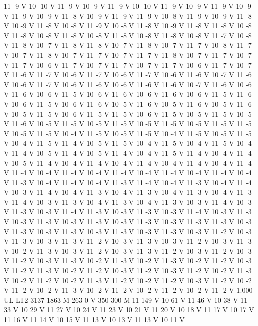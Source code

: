 {11 -9 V
10 -10 V
11 -9 V
10 -9 V
11 -9 V
10 -10 V
11 -9 V
10 -9 V
11 -9 V
10 -9 V
11 -9 V
10 -9 V
11 -8 V
10 -9 V
11 -9 V
11 -9 V
10 -8 V
11 -9 V
10 -9 V
11 -8 V
10 -9 V
11 -8 V
10 -8 V
11 -9 V
10 -8 V
11 -8 V
10 -9 V
11 -8 V
11 -8 V
10 -8 V
11 -8 V
10 -8 V
11 -8 V
10 -8 V
11 -8 V
10 -8 V
11 -8 V
10 -8 V
11 -7 V
10 -8 V
11 -8 V
10 -7 V
11 -8 V
11 -8 V
10 -7 V
11 -8 V
10 -7 V
11 -7 V
10 -8 V
11 -7 V
10 -7 V
11 -8 V
10 -7 V
11 -7 V
10 -7 V
11 -7 V
11 -8 V
10 -7 V
11 -7 V
10 -7 V
11 -7 V
10 -6 V
11 -7 V
10 -7 V
11 -7 V
10 -7 V
11 -7 V
10 -6 V
11 -7 V
10 -7 V
11 -6 V
11 -7 V
10 -6 V
11 -7 V
10 -6 V
11 -7 V
10 -6 V
11 -6 V
10 -7 V
11 -6 V
10 -6 V
11 -7 V
10 -6 V
11 -6 V
10 -6 V
11 -6 V
11 -6 V
10 -7 V
11 -6 V
10 -6 V
11 -6 V
10 -6 V
11 -5 V
10 -6 V
11 -6 V
10 -6 V
11 -6 V
10 -6 V
11 -5 V
11 -6 V
10 -6 V
11 -5 V
10 -6 V
11 -6 V
10 -5 V
11 -6 V
10 -5 V
11 -6 V
10 -5 V
11 -6 V
10 -5 V
11 -5 V
10 -6 V
11 -5 V
11 -5 V
10 -6 V
11 -5 V
10 -5 V
11 -5 V
10 -5 V
11 -6 V
10 -5 V
11 -5 V
10 -5 V
11 -5 V
10 -5 V
11 -5 V
10 -5 V
11 -5 V
11 -5 V
10 -5 V
11 -5 V
10 -4 V
11 -5 V
10 -5 V
11 -5 V
10 -4 V
11 -5 V
10 -5 V
11 -5 V
10 -4 V
11 -5 V
11 -4 V
10 -5 V
11 -5 V
10 -4 V
11 -5 V
10 -4 V
11 -5 V
10 -4 V
11 -4 V
10 -5 V
11 -4 V
10 -5 V
11 -4 V
10 -4 V
11 -5 V
11 -4 V
10 -4 V
11 -4 V
10 -5 V
11 -4 V
10 -4 V
11 -4 V
10 -4 V
11 -4 V
10 -4 V
11 -4 V
10 -4 V
11 -4 V
11 -4 V
10 -4 V
11 -4 V
10 -4 V
11 -4 V
10 -4 V
11 -4 V
10 -4 V
11 -4 V
10 -4 V
11 -3 V
10 -4 V
11 -4 V
10 -4 V
11 -3 V
11 -4 V
10 -4 V
11 -3 V
10 -4 V
11 -4 V
10 -3 V
11 -4 V
10 -4 V
11 -3 V
10 -4 V
11 -3 V
10 -4 V
11 -3 V
10 -4 V
11 -3 V
11 -4 V
10 -3 V
11 -3 V
10 -4 V
11 -3 V
10 -4 V
11 -3 V
10 -3 V
11 -4 V
10 -3 V
11 -3 V
10 -3 V
11 -4 V
11 -3 V
10 -3 V
11 -3 V
10 -3 V
11 -4 V
10 -3 V
11 -3 V
10 -3 V
11 -3 V
10 -3 V
11 -3 V
10 -3 V
11 -3 V
10 -3 V
11 -3 V
11 -3 V
10 -3 V
11 -3 V
10 -3 V
11 -3 V
10 -3 V
11 -3 V
10 -3 V
11 -3 V
10 -3 V
11 -2 V
10 -3 V
11 -3 V
10 -3 V
11 -3 V
11 -2 V
10 -3 V
11 -3 V
10 -3 V
11 -2 V
10 -3 V
11 -3 V
10 -2 V
11 -3 V
10 -3 V
11 -2 V
10 -3 V
11 -3 V
11 -2 V
10 -3 V
11 -2 V
10 -3 V
11 -2 V
10 -3 V
11 -3 V
10 -2 V
11 -3 V
10 -2 V
11 -3 V
10 -2 V
11 -2 V
10 -3 V
11 -2 V
11 -3 V
10 -2 V
11 -2 V
10 -3 V
11 -2 V
10 -3 V
11 -2 V
10 -2 V
11 -3 V
10 -2 V
11 -2 V
10 -2 V
11 -3 V
11 -2 V
10 -2 V
11 -2 V
10 -3 V
11 -2 V
10 -2 V
11 -2 V
10 -2 V
11 -3 V
10 -2 V
11 -2 V
10 -2 V
11 -2 V
10 -2 V
11 -2 V
1.000 UL
LT2
3137 1863 M
263 0 V
350 300 M
11 149 V
10 61 V
11 46 V
10 38 V
11 33 V
10 29 V
11 27 V
10 24 V
11 23 V
10 21 V
11 20 V
10 18 V
11 17 V
10 17 V
11 16 V
11 14 V
10 15 V
11 13 V
10 13 V
11 13 V
10 11 V
}
